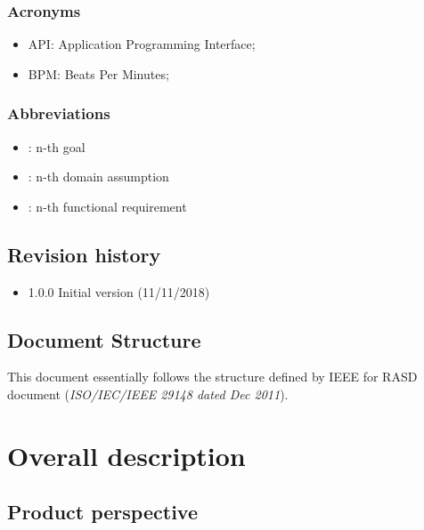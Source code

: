\documentclass{article}
\begin{document}
\subsubsection{Acronyms}
\begin{itemize}
\item API: Application Programming Interface;
\item BPM: Beats Per Minutes;
\end{itemize}

\subsubsection{Abbreviations}
\begin{itemize}
		\item \begin{math}[Gn]\end{math}: n-th goal
		\item \begin{math}[Dn]\end{math}: n-th domain assumption 
		\item \begin{math}[Rn]\end{math}: n-th functional requirement
\end{itemize}

\subsection{Revision history}
\begin{itemize}
	\item 1.0.0 Initial version (11/11/2018)
\end{itemize}
\subsection{Document Structure}
This document essentially follows the structure defined by IEEE for RASD document (\textit{ISO/IEC/IEEE 29148 dated Dec 2011}).

\newpage
\section{Overall description}

\subsection{Product perspective}
\end{document}
